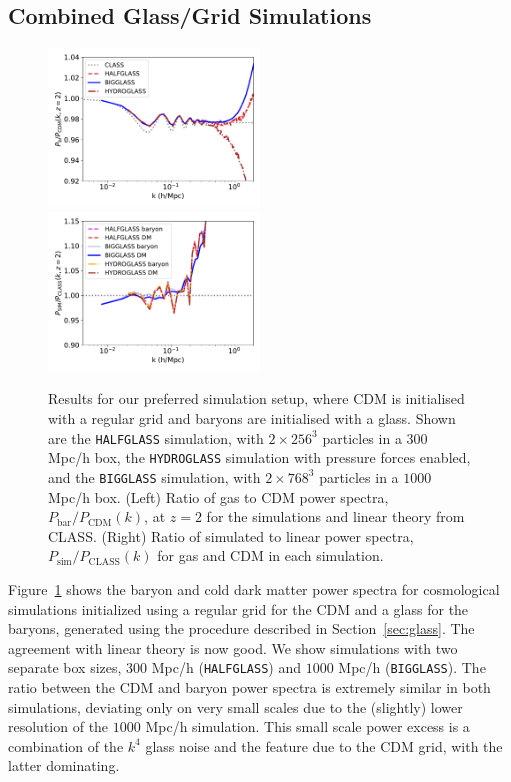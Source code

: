\documentclass[a4paper,11pt]{article}
\begin{document}
\subsection{Combined Glass/Grid Simulations}
\label{sec:halfglass}

\begin{figure}
\includegraphics[width=0.5\textwidth]{plots/halfglass_2_relpower.pdf}
  \includegraphics[width=0.5\textwidth]{plots/halfglass_2_class.pdf}
\caption{Results for our preferred simulation setup, where CDM is initialised with a regular grid and baryons are initialised with a glass. Shown are the \texttt{HALFGLASS} simulation, with $2\times 256^3$ particles in a $300$ Mpc/h box, the \texttt{HYDROGLASS} simulation with pressure forces enabled, and the \texttt{BIGGLASS} simulation, with $2\times 768^3$ particles in a $1000$ Mpc/h box. (Left) Ratio of gas to CDM power spectra, $P_\mathrm{bar}/P_\mathrm{CDM}(k)$, at $z=2$ for the simulations and linear theory from CLASS. (Right) Ratio of simulated to linear power spectra, $P_\mathrm{sim}/P_\mathrm{CLASS}(k)$ for gas and CDM in each simulation.}
  \label{fig:baryonglass}
\end{figure}

Figure~\ref{fig:baryonglass} shows the baryon and cold dark matter power spectra for cosmological simulations initialized using a regular grid for the CDM and a glass for the baryons, generated using the procedure described in Section~\ref{sec:glass}. The agreement with linear theory is now good. We show simulations with two separate box sizes, $300$ Mpc/h (\texttt{HALFGLASS}) and $1000$ Mpc/h (\texttt{BIGGLASS}). The ratio between the CDM and baryon power spectra is extremely similar in both simulations, deviating only on very small scales due to the (slightly) lower resolution of the $1000$ Mpc/h simulation. This small scale power excess is a combination of the $k^4$ glass noise and the feature due to the CDM grid, with the latter dominating.
\end{document}
